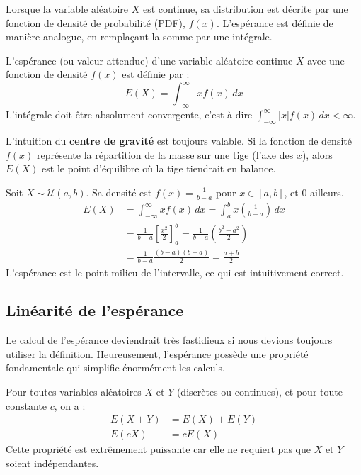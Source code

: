 Lorsque la variable aléatoire $X$ est continue, sa distribution est décrite par une fonction de densité de probabilité (PDF), $f(x)$. L'espérance est définie de manière analogue, en remplaçant la somme par une intégrale.

\begin{definitionbox}
L'espérance (ou valeur attendue) d'une variable aléatoire continue $X$ avec une fonction de densité $f(x)$ est définie par :
$$ E(X) = \int_{-\infty}^{\infty} x f(x) \, dx $$
L'intégrale doit être absolument convergente, c'est-à-dire $\int_{-\infty}^{\infty} |x| f(x) \, dx < \infty$.
\end{definitionbox}

\begin{intuitionbox}
L'intuition du \textbf{centre de gravité} est toujours valable. Si la fonction de densité $f(x)$ représente la répartition de la masse sur une tige (l'axe des $x$), alors $E(X)$ est le point d'équilibre où la tige tiendrait en balance.
\end{intuitionbox}

\begin{examplebox}
Soit $X \sim \mathcal{U}(a, b)$. Sa densité est $f(x) = \frac{1}{b-a}$ pour $x \in [a, b]$, et 0 ailleurs.
\begin{align*}
E(X) &= \int_{-\infty}^{\infty} x f(x) \, dx = \int_{a}^{b} x \left( \frac{1}{b-a} \right) \, dx \\
&= \frac{1}{b-a} \left[ \frac{x^2}{2} \right]_a^b = \frac{1}{b-a} \left( \frac{b^2 - a^2}{2} \right) \\
&= \frac{1}{b-a} \frac{(b-a)(b+a)}{2} = \frac{a+b}{2}
\end{align*}
L'espérance est le point milieu de l'intervalle, ce qui est intuitivement correct.
\end{examplebox}

\subsection{Linéarité de l'espérance}

Le calcul de l'espérance deviendrait très fastidieux si nous devions toujours utiliser la définition. Heureusement, l'espérance possède une propriété fondamentale qui simplifie énormément les calculs.

\begin{theorembox}
Pour toutes variables aléatoires $X$ et $Y$ (discrètes ou continues), et pour toute constante $c$, on a :
\begin{align*}
E(X+Y) &= E(X) + E(Y) \\
E(cX) &= cE(X)
\end{align*}
Cette propriété est extrêmement puissante car elle ne requiert pas que $X$ et $Y$ soient indépendantes.
\end{theorembox}

